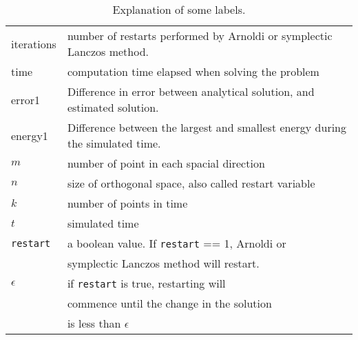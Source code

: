 \begin{table}[h]
\centering
\begin{tabular}{l| l}
 iterations& number of restarts performed by Arnoldi or symplectic Lanczos method.  \\
 time & computation time elapsed when solving the problem \\
 error1 &  Difference in error between analytical solution, and estimated solution. \\
 energy1 & Difference between the largest and smallest energy during the simulated time. \\
$m$ & number of point in each spacial direction \\
$n$ & size of orthogonal space, also called restart variable \\
$k$ & number of points in time \\
$t$ & simulated time \\
\texttt{restart}& a boolean value. If \texttt{restart} == 1, Arnoldi or \\&symplectic Lanczos method will restart. \\
$\epsilon$ & if \texttt{restart} is true, restarting will\\& commence until the change in the solution\\& is less than $\epsilon$ \\
\end{tabular}
\caption{ Explanation of some labels. }
\label{tab:labels}
\end{table}

